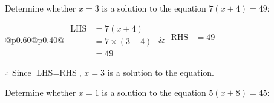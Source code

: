 \documentclass[12pt]{article}
\newcounter{minipagecount}
\begin{document}
\begin{multicols}{2}
\begin{minipage}[t]{0.40\textwidth}
    \noindent Determine whether \(x = 3\) is a solution to the equation \(7(x + 4) = 49\):
    \vspace{4pt}  %

    \noindent

    \renewcommand{\arraystretch}{1.3} %
    \begin{tabular}{@{}p{0.60\linewidth}@{}p{0.40\linewidth}@{}}
        \(\begin{aligned}
            \text{LHS} &= 7(x + 4) \\
                    &= 7 \times(3 + 4) \\
                    &= 49
        \end{aligned}\) &
        \(\begin{aligned}
            \text{RHS} &= 49\\
                    & \\
                    &
        \end{aligned}\)
    \end{tabular}
    \renewcommand{\arraystretch}{1.0} %
    \vspace{2pt}  %

    \noindent \(\therefore\) Since \(\text{LHS} = \text{RHS}\), \(x = 3\) is  a solution to the equation.

\end{minipage}

 \vspace*{16pt}
\noindent{(\theminipagecount)}\hspace{0.1mm} %
\begin{minipage}[t]{0.40\textwidth} %

    \noindent Determine whether \(x = 1\) is a solution to the equation \(5(x + 8) = 45\):
    \vspace{4pt}  %

    \noindent


\end{minipage}
\end{multicols}
\end{document}
